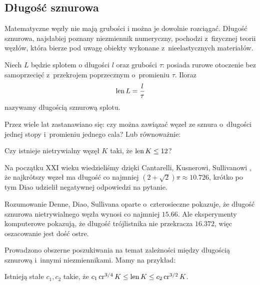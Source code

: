 
\subsection{Długość sznurowa}
%
Matematyczne węzły nie mają grubości i można je dowolnie rozciągać.
Długość sznurowa, najsłabiej poznany niezmiennik numeryczny, pochodzi z~fizycznej teorii węzłów, która bierze pod uwagę obiekty wykonane z~nieelastycznych materiałów.

\begin{definition}
    Niech $L$ będzie splotem o długości $l$ oraz grubości $\tau$: posiada rurowe otoczenie bez samoprzecięć z~przekrojem poprzecznym o~promieniu $\tau$.
    Iloraz
    \begin{equation}
        \operatorname{len} L = \frac l \tau
    \end{equation}
    nazywamy długością sznurową splotu.
\end{definition}

Przez wiele lat zastanawiano się: czy można zawiązać węzeł ze sznura o~długości jednej stopy i~promieniu jednego cala?
Lub równoważnie:

\begin{conjecture}
    Czy istnieje nietrywialny węzęł $K$ taki, że $\operatorname{len} K \le 12$?
\end{conjecture}

Na początku XXI wieku wiedzieliśmy dzięki Cantarelli, Kusnerowi, Sullivanowi \cite{cantarella02}, że najkrótszy węzeł ma długość co najmniej $(2 + \sqrt 2)\pi \approx 10.726$, krótko po tym Diao \cite[s. 14]{diao03} udzielił negatywnej odpowiedzi na pytanie.
%
%
%
%

Rozumowanie Denne, Diao, Sullivana \cite{denne06} oparte o~czterosieczne pokazuje, że długość sznurowa nietrywialnego węzła wynosi co najmniej $15.66$.
Ale eksperymenty komputerowe pokazują, że długość trójlistnika nie przekracza $16.372$, więc oszacowanie jest dość ostre.

Prowadzono obszerne poszukiwania na temat zależności między długością sznurową i~innymi niezmiennikami.
Mamy na przykład:

\begin{proposition}
    Istnieją stałe $c_1, c_2$ takie, że $c_1 \operatorname{cr}^{3/4} K \le \operatorname{len} K \le c_2 \operatorname{cr}^{3/2} K$.
\end{proposition}

